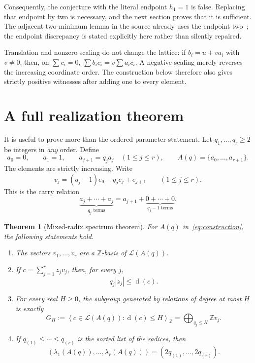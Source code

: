 \documentclass[11pt]{article}
\numberwithin{equation}{section}
\newtheorem{theorem}{Theorem}[section]
\theoremstyle{definition}
\theoremstyle{remark}\newtheorem{remark}[theorem]{Remark}
\newcommand{\Z}{\mathbb Z}\newcommand{\N}{\mathbb N}
\newcommand{\Latt}{\mathcal L}
\newcommand{\dgr}{\operatorname{d}}
\begin{document}
Consequently, the conjecture with the literal endpoint $h_1=1$ is false.
Replacing that endpoint by two is necessary, and the next section proves
that it is sufficient.  The adjacent two-minimum lemma in the source already
uses the endpoint two~\cite{obryant}; the endpoint discrepancy is stated
explicitly here rather than silently repaired.

Translation and nonzero scaling do not change the lattice: if
$b_i=u+v a_i$ with $v\ne0$, then, on $\sum c_i=0$,
$\sum b_i c_i=v\sum a_i c_i$.  A negative scaling merely reverses the
increasing coordinate order.  The construction below therefore also gives
strictly positive witnesses after adding one to every element.

\section{A full realization theorem}
\label{sec:main}

It is useful to prove more than the ordered-parameter statement.  Let
$q_1,\ldots,q_r\ge2$ be integers in \emph{any} order.  Define
\begin{equation}\label{eq:construction}
 a_0=0,\qquad a_1=1,\qquad a_{j+1}=q_j a_j\quad(1\le j\le r),
 \qquad A(q)=\{a_0,\ldots,a_{r+1}\}.
\end{equation}
The elements are strictly increasing.  Write
\begin{equation}\label{eq:carry}
 v_j=(q_j-1)e_0-q_j e_j+e_{j+1}\qquad(1\le j\le r).
\end{equation}
This is the carry relation
\[
 \underbrace{a_j+\cdots+a_j}_{q_j\text{ terms}}
 =a_{j+1}+\underbrace{0+\cdots+0}_{q_j-1\text{ terms}}.
\]

\begin{theorem}[Mixed-radix spectrum theorem]
\label{thm:spectrum}
For $A(q)$ in~\eqref{eq:construction}, the following statements hold.
\begin{enumerate}[label=\textup{(\roman*)},itemsep=0.25em]
\item The vectors $v_1,\ldots,v_r$ are a $\Z$-basis of $\Latt(A(q))$.
\item If $c=\sum_{j=1}^r z_jv_j$, then, for every $j$,
\begin{equation}\label{eq:coordinatebound}
 q_j|z_j|\le\dgr(c).
\end{equation}
\item For every real $H\ge0$, the subgroup generated by relations of degree
at most $H$ is exactly
\begin{equation}\label{eq:filtration}
 G_H:=\left\langle c\in\Latt(A(q)):\dgr(c)\le H\right\rangle_\Z
       =\bigoplus_{q_j\le H}\Z v_j.
\end{equation}
\item If $q_{(1)}\le\cdots\le q_{(r)}$ is the sorted list of the radices,
then
\begin{equation}\label{eq:spectrum}
 (\lambda_1(A(q)),\ldots,\lambda_r(A(q)))
       =(2q_{(1)},\ldots,2q_{(r)}).
\end{equation}
\end{enumerate}
\end{theorem}
\end{document}
